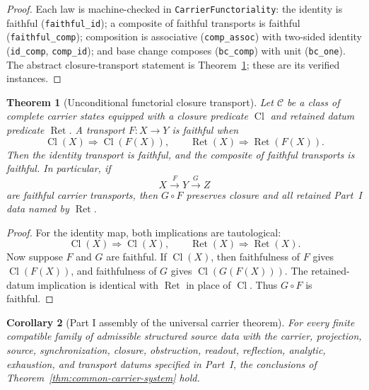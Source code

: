 \documentclass[11pt]{article}
\newtheorem{theorem}{Theorem}
\newtheorem{corollary}[theorem]{Corollary}
\theoremstyle{definition}
\begin{document}
\begin{proof}
Each law is machine-checked in \texttt{CarrierFunctoriality}: the
identity is faithful (\texttt{faithful\_id}); a composite of faithful transports
is faithful (\texttt{faithful\_comp}); composition is associative
(\texttt{comp\_assoc}) with two-sided identity (\texttt{id\_comp},
\texttt{comp\_id}); and base change composes (\texttt{bc\_comp}) with unit
(\texttt{bc\_one}).  The abstract closure-transport statement is
Theorem~\ref{thm:g10-functorial-closure-transport}; these are its verified
instances.
\end{proof}

\begin{theorem}[Unconditional functorial closure transport]\label{thm:g10-functorial-closure-transport}
Let \(\mathcal C\) be a class of complete carrier states equipped with a
closure predicate \(\operatorname{Cl}\) and retained datum predicate
\(\operatorname{Ret}\).  A transport \(F:X\to Y\) is faithful when
\[
\operatorname{Cl}(X)\Rightarrow \operatorname{Cl}(F(X)),
\qquad
\operatorname{Ret}(X)\Rightarrow \operatorname{Ret}(F(X)).
\]
Then the identity transport is faithful, and the composite of faithful
transports is faithful.  In particular, if
\[
X\xrightarrow{F}Y\xrightarrow{G}Z
\]
are faithful carrier transports, then \(G\circ F\) preserves closure and all
retained Part~I data named by \(\operatorname{Ret}\).
\end{theorem}

\begin{proof}
For the identity map, both implications are tautological:
\[
\operatorname{Cl}(X)\Rightarrow \operatorname{Cl}(X),
\qquad
\operatorname{Ret}(X)\Rightarrow \operatorname{Ret}(X).
\]
Now suppose \(F\) and \(G\) are faithful.  If \(\operatorname{Cl}(X)\), then
faithfulness of \(F\) gives \(\operatorname{Cl}(F(X))\), and faithfulness of
\(G\) gives \(\operatorname{Cl}(G(F(X)))\).  The retained-datum implication is
identical with \(\operatorname{Ret}\) in place of \(\operatorname{Cl}\).  Thus
\(G\circ F\) is faithful.
\end{proof}

\begin{corollary}[Part I assembly of the universal carrier theorem]\label{cor:g1-g10-partI-assembly}
For every finite compatible family of admissible structured source data with
the carrier, projection, source, synchronization, closure, obstruction,
readout, reflection, analytic, exhaustion, and transport datums specified in
Part~I, the conclusions of Theorem~\ref{thm:common-carrier-system} hold.
\end{corollary}
\end{document}
